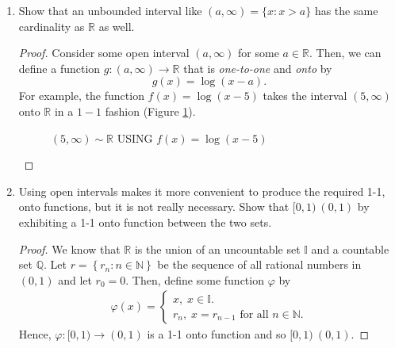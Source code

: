 \documentclass[12pt]{article}
\newcommand{\N}{\mathbb{N}}
\newcommand{\R}{\mathbb{R}}
\newcommand{\Q}{\mathbb{Q}}
\newenvironment{problem}[2][Problem]{\begin{trivlist}
		\item[\hskip \labelsep {\bfseries #1}\hskip \labelsep {\bfseries #2.}]}{\end{trivlist}}
\begin{document}
\begin{problem}{1.5.4}
\begin{enumerate}[label=(\alph*)]
		\item Show that an unbounded interval like $(a,\infty) = \{x:x>a\}$ has the same cardinality as $\R$ as well.
		\begin{proof}
			Consider some open interval $(a,\infty)$ for some $a\in \R$. Then, we can define a function $g:(a,\infty) \to \R$ that is \textit{one-to-one} and \textit{onto} by
			\begin{equation*}
				g(x)=\log (x-a).
			\end{equation*}
			For example, the function $f(x)=\log(x-5)$ takes the interval $(5,\infty)$ onto $\R$ in a $1-1$ fashion (Figure \ref{fig:inf}).

		\begin{figure}
                \centering
                \label{fig:inf}
		\caption{$(5,\infty)\sim \R$ USING $f(x)=\log(x-5)$}
                \end{figure}
		\end{proof}
	      \item Using open intervals makes it more convenient to produce the required 1-1, onto functions, but it is not really necessary. Show that $[0,1)~(0,1)$ by exhibiting a 1-1 onto function between the two sets.
		\begin{proof}
		  We know that $\R$ is the union of an uncountable set $\mathbb{I}$ and a countable set $\Q$. Let $r = \left\{r_{n}:n\in \N \right\}$ be the sequence of all rational numbers in $(0,1)$ and let $r_{0} = 0$. Then, define some function $\varphi$ by
		  \begin{align*}
		    \varphi(x) = \begin{cases}
		      x, \; x\in\mathbb{I}.\\
		      r_{n}, \; x = r_{n-1} \text{ for all } n\in\N.
		    \end{cases}
		  \end{align*}
		  Hence, $\varphi: [0,1) \to (0,1)$ is a 1-1 onto function and so $[0,1)~(0,1)$.
		\end{proof}
	 \end{enumerate}
      
\end{problem}
\end{document}
